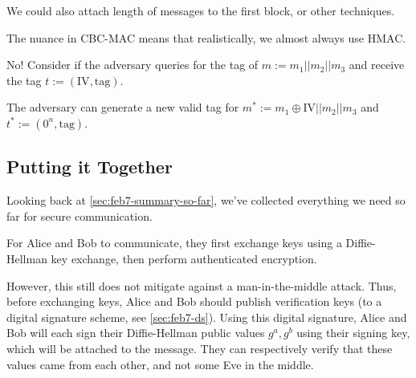 
We could also attach length of messages to the first block, or other techniques.

The nuance in CBC-MAC means that realistically, we almost always use HMAC.


No! Consider if the adversary queries for the tag of $m := m_1 || m_2 || m_3$ and receive the tag $t := (\text{IV}, \text{tag})$.

The adversary can generate a new valid tag for $m^* := m_1 \oplus \text{IV} || m_2 || m_3$ and $t^* := (0^n, \text{tag})$.


\subsection{Putting it Together}

Looking back at \cref{sec:feb7-summary-so-far}, we've collected everything we need so far for secure communication.

For Alice and Bob to communicate, they first exchange keys using a Diffie-Hellman key exchange, then perform authenticated encryption.


However, this still does not mitigate against a man-in-the-middle attack. Thus, before exchanging keys, Alice and Bob should publish verification keys (to a digital signature scheme, see \cref{sec:feb7-ds}). Using this digital signature, Alice and Bob will each sign their Diffie-Hellman public values $g^a, g^b$ using their signing key, which will be attached to the message. They can respectively verify that these values came from each other, and not some Eve in the middle.